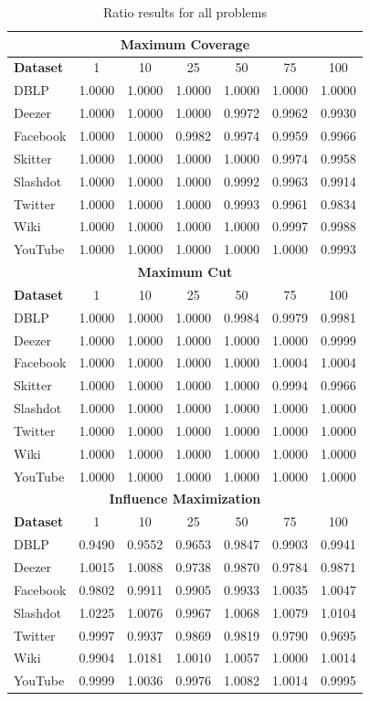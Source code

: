 \begin{table}[ht]
\centering
\caption{Ratio results for all problems}
\label{tab:all_problems_ratio}
\begin{tabular}{lcccccc}
\toprule
\multicolumn{7}{c}{\textbf{Maximum Coverage}} \\
\midrule
\textbf{Dataset} & 1 & 10 & 25 & 50 & 75 & 100 \\
\midrule
DBLP & 1.0000 & 1.0000 & 1.0000 & 1.0000 & 1.0000 & 1.0000 \\
Deezer & 1.0000 & 1.0000 & 1.0000 & 0.9972 & 0.9962 & 0.9930 \\
Facebook & 1.0000 & 1.0000 & 0.9982 & 0.9974 & 0.9959 & 0.9966 \\
Skitter & 1.0000 & 1.0000 & 1.0000 & 1.0000 & 0.9974 & 0.9958 \\
Slashdot & 1.0000 & 1.0000 & 1.0000 & 0.9992 & 0.9963 & 0.9914 \\
Twitter & 1.0000 & 1.0000 & 1.0000 & 0.9993 & 0.9961 & 0.9834 \\
Wiki & 1.0000 & 1.0000 & 1.0000 & 1.0000 & 0.9997 & 0.9988 \\
YouTube & 1.0000 & 1.0000 & 1.0000 & 1.0000 & 1.0000 & 0.9993 \\
\midrule
\multicolumn{7}{c}{\textbf{Maximum Cut}} \\
\midrule
\textbf{Dataset} & 1 & 10 & 25 & 50 & 75 & 100 \\
\midrule
DBLP & 1.0000 & 1.0000 & 1.0000 & 0.9984 & 0.9979 & 0.9981 \\
Deezer & 1.0000 & 1.0000 & 1.0000 & 1.0000 & 1.0000 & 0.9999 \\
Facebook & 1.0000 & 1.0000 & 1.0000 & 1.0000 & 1.0004 & 1.0004 \\
Skitter & 1.0000 & 1.0000 & 1.0000 & 1.0000 & 0.9994 & 0.9966 \\
Slashdot & 1.0000 & 1.0000 & 1.0000 & 1.0000 & 1.0000 & 1.0000 \\
Twitter & 1.0000 & 1.0000 & 1.0000 & 1.0000 & 1.0000 & 1.0000 \\
Wiki & 1.0000 & 1.0000 & 1.0000 & 1.0000 & 1.0000 & 1.0000 \\
YouTube & 1.0000 & 1.0000 & 1.0000 & 1.0000 & 1.0000 & 1.0000 \\
\midrule
\multicolumn{7}{c}{\textbf{Influence Maximization}} \\
\midrule
\textbf{Dataset} & 1 & 10 & 25 & 50 & 75 & 100 \\
\midrule
DBLP & 0.9490 & 0.9552 & 0.9653 & 0.9847 & 0.9903 & 0.9941 \\
Deezer & 1.0015 & 1.0088 & 0.9738 & 0.9870 & 0.9784 & 0.9871 \\
Facebook & 0.9802 & 0.9911 & 0.9905 & 0.9933 & 1.0035 & 1.0047 \\
Slashdot & 1.0225 & 1.0076 & 0.9967 & 1.0068 & 1.0079 & 1.0104 \\
Twitter & 0.9997 & 0.9937 & 0.9869 & 0.9819 & 0.9790 & 0.9695 \\
Wiki & 0.9904 & 1.0181 & 1.0010 & 1.0057 & 1.0000 & 1.0014 \\
YouTube & 0.9999 & 1.0036 & 0.9976 & 1.0082 & 1.0014 & 0.9995 \\
\midrule
\bottomrule
\end{tabular}
\end{table}